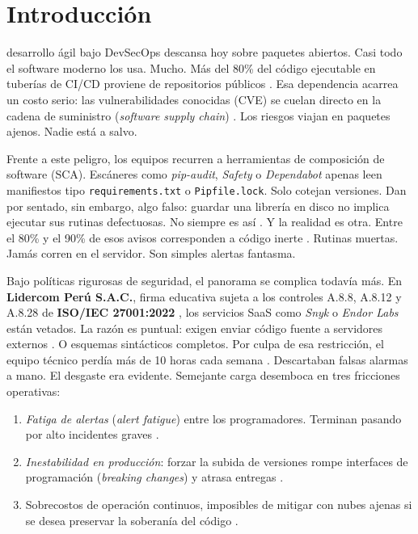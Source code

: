 \documentclass[conference]{IEEEtran}
\begin{document}
\section{Introducción}
 desarrollo ágil bajo DevSecOps descansa hoy sobre paquetes abiertos. Casi todo el software moderno los usa. Mucho. Más del 80\% del código ejecutable en tuberías de CI/CD proviene de repositorios públicos \cite{synopsys2024ossra, decan2019empirical}. Esa dependencia acarrea un costo serio: las vulnerabilidades conocidas (CVE) se cuelan directo en la cadena de suministro (\textit{software supply chain}) \cite{ladisa2023sok, alfadel2023empirical, chinthanet2023lag}. Los riesgos viajan en paquetes ajenos. Nadie está a salvo.

Frente a este peligro, los equipos recurren a herramientas de composición de software (SCA). Escáneres como \textit{pip-audit}, \textit{Safety} o \textit{Dependabot} apenas leen manifiestos tipo \texttt{requirements.txt} o \texttt{Pipfile.lock}. Solo cotejan versiones. Dan por sentado, sin embargo, algo falso: guardar una librería en disco no implica ejecutar sus rutinas defectuosas. No siempre es así \cite{pashchenko2022vuln4real, dann2021identifying, duan2023towards}. Y la realidad es otra. Entre el 80\% y el 90\% de esos avisos corresponden a código inerte \cite{pashchenko2022vuln4real, ponta2020detection, prana2022empirical}. Rutinas muertas. Jamás corren en el servidor. Son simples alertas fantasma.

Bajo políticas rigurosas de seguridad, el panorama se complica todavía más. En \textbf{Lidercom Perú S.A.C.}, firma educativa sujeta a los controles A.8.8, A.8.12 y A.8.28 de \textbf{ISO/IEC 27001:2022} \cite{iso2022sec, gutierrez2024auditoria}, los servicios SaaS como \textit{Snyk} o \textit{Endor Labs} están vetados. La razón es puntual: exigen enviar código fuente a servidores externos \cite{ladisa2023sok, ohm2022sok}. O esquemas sintácticos completos. Por culpa de esa restricción, el equipo técnico perdía más de 10 horas cada semana \cite{sadowski2018lessons}. Descartaban falsas alarmas a mano. El desgaste era evidente. Semejante carga desemboca en tres fricciones operativas:
\begin{enumerate}
    \item \textit{Fatiga de alertas} (\textit{alert fatigue}) entre los programadores. Terminan pasando por alto incidentes graves \cite{johnson2013developers}.
    \item \textit{Inestabilidad en producción}: forzar la subida de versiones rompe interfaces de programación (\textit{breaking changes}) y atrasa entregas \cite{bogart2016break, xavier2017historical}.
    \item Sobrecostos de operación continuos, imposibles de mitigar con nubes ajenas si se desea preservar la soberanía del código \cite{ladisa2023sok}.
\end{enumerate}
\end{document}
